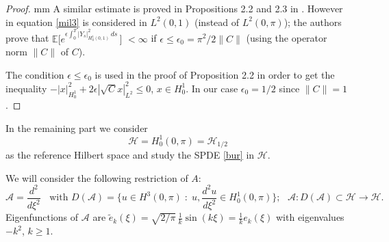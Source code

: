 \documentclass[preprint]{imsart}
\def\E{\mathbb E}
\def\A{\mathcal A}
\def\H{\mathcal  H}
\begin{document}
\begin{proof}
 mm  A similar  estimate is proved in  Propositions 2.2 and 2.3 in \cite{burgers}. However in \cite{burgers} equation \eqref{mil3} is considered in $L^2(0,1)$ (instead of $ L^2(0, \pi)$); the authors prove 
that $\E \big [ e^{\epsilon  \int_0^T  |Y_s  |_{H^1_0(0,1)}^2 \,  ds}\, \big] $ $ < \infty$ if $\epsilon \le \epsilon_0 = \pi^2 / 2 \|C \|$ (using the operator   norm  $\|C \|$ of $C$).

The condition $\epsilon \le \epsilon_0$  is used in the proof of Proposition 2.2 in order to get the inequality  $- |x|^2_{H^1_0} + 2 \epsilon |\sqrt{C} x|_{L^2}^2 \le 0$, $x \in H^1_0$. In our case   $\epsilon_0 =1/2$ since $\| C\|=1$.
 \end{proof}
In the remaining part   we consider  
$$
\H = H^1_0 (0, \pi) = {\mathcal H}_{1/2}
$$  
as the reference Hilbert space and  study the SPDE \eqref{bur} 
 in $\H$.  
 
 We will  consider  the following restriction of $A:$ 
 \begin{equation} \label{aa2}
  \A = \frac{d^2}{d  \xi^2} \;\; \text{ with   $D(\A) = \big \{ u \in H^3(0, \pi) \; : \; u, \frac{d^2 u}{d  \xi^2}  \in  H^1_0 (0, \pi) \big \}$;} \;\;\; \A : D(\A) \subset \H \to \H.  
\end{equation}
Eigenfunctions of $\A$ are $\tilde e_k(\xi)= \sqrt{2/\pi} \, \frac{1}{k}  \sin (k \xi) =  
 \frac{1}{k} e_k(\xi)
$ with  eigenvalues  $- k^2$, $k \ge 1$.   
\end{document}
